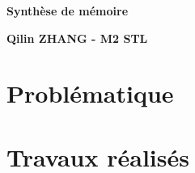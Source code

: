 \documentclass[french]{article}
\begin{document}
	\begin{center}
		\textbf{\LARGE{Synthèse de mémoire}}
	\end{center}
	
	\begin{center}
		\textbf{\Large{Qilin ZHANG - M2 STL}}
	\end{center}

	\section{Problématique}
	
	\section{Travaux réalisés}
\end{document}
